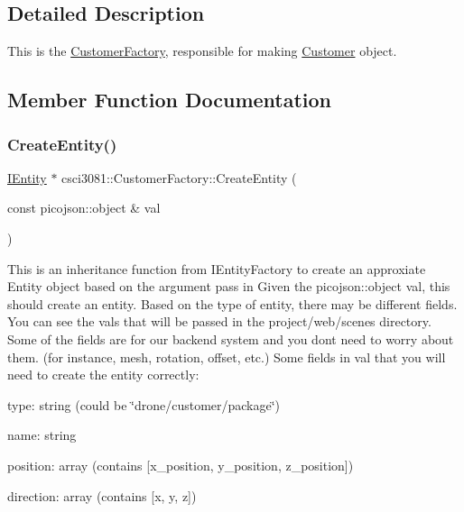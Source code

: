 \subsection{Detailed Description}
This is the \hyperlink{classcsci3081_1_1CustomerFactory}{Customer\+Factory}, responsible for making \hyperlink{classcsci3081_1_1Customer}{Customer} object. 

\subsection{Member Function Documentation}
\mbox{\label{classcsci3081_1_1CustomerFactory_ad184f214fa10ad531e1ae2432142fc45}} 
\subsubsection{\texorpdfstring{Create\+Entity()}{CreateEntity()}}
{\footnotesize\ttfamily \hyperlink{classentity__project_1_1IEntity}{I\+Entity} $\ast$ csci3081\+::\+Customer\+Factory\+::\+Create\+Entity (\begin{DoxyParamCaption}\item[{const picojson\+::object \&}]{val }\end{DoxyParamCaption})\hspace{0.3cm}{\ttfamily [virtual]}}



This is an inheritance function from I\+Entity\+Factory to create an approxiate Entity object based on the argument pass in Given the picojson\+::object val, this should create an entity. Based on the type of entity, there may be different fields. You can see the vals that will be passed in the project/web/scenes directory. Some of the fields are for our backend system and you don\textquotesingle{}t need to worry about them. (for instance, mesh, rotation, offset, etc.) Some fields in val that you will need to create the entity correctly\+: 

type\+: string (could be \char`\"{}drone/customer/package\char`\"{})

name\+: string

position\+: array (contains \mbox{[}x\+\_\+position, y\+\_\+position, z\+\_\+position\mbox{]})

direction\+: array (contains \mbox{[}x, y, z\mbox{]})


